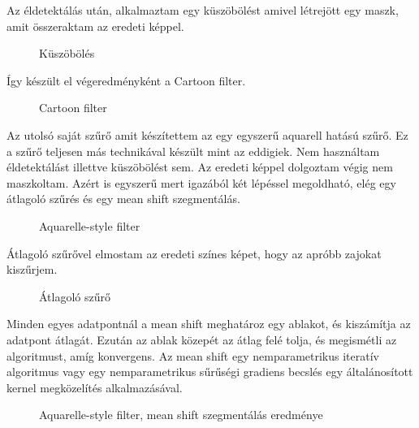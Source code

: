 Az éldetektálás után, alkalmaztam egy küszöbölést amivel létrejött egy maszk, amit összeraktam az eredeti képpel.
\begin{figure}[ht]
\centering
{}
\caption{Küszöbölés  } 
\label{fig:  2_cartoon4}
\end{figure}
Így készült el végeredményként a Cartoon filter.
\begin{figure}[ht]
\centering
{}
\caption{Cartoon filter  } 
\label{fig:  2_cartoon4}
\end{figure}
\newpage
{}
Az utolsó saját szűrő amit készítettem az egy egyszerű aquarell hatású szűrő. Ez a szűrő teljesen más technikával készült mint az eddigiek. Nem használtam éldetektálást illettve küszöbölést sem. Az eredeti képpel dolgoztam végig nem maszkoltam. Azért is egyszerű mert igazából két lépéssel megoldható, elég egy átlagoló szűrés és egy mean shift szegmentálás.
\begin{figure}[ht]
\centering
{}
\caption{Aquarelle-style filter} 
\label{fig:  paint}
\end{figure}
Átlagoló szűrővel elmostam az eredeti színes képet, hogy az apróbb zajokat kiszűrjem.
\begin{figure}[ht]
\centering
{}
\caption{Átlagoló szűrő  } 
\label{fig: paint1}
\end{figure}
Minden egyes adatpontnál a mean shift meghatároz egy ablakot, és kiszámítja az adatpont átlagát. Ezután az ablak közepét az átlag felé tolja, és megismétli az algoritmust, amíg konvergens. Az mean shift egy nemparametrikus iteratív algoritmus vagy egy nemparametrikus sűrűségi gradiens becslés egy általánosított kernel megközelítés alkalmazásával.
\begin{figure}[ht]
\centering
{}
\caption{Aquarelle-style filter, mean shift szegmentálás  eredménye} 
\label{fig: paint1}
\end{figure}
